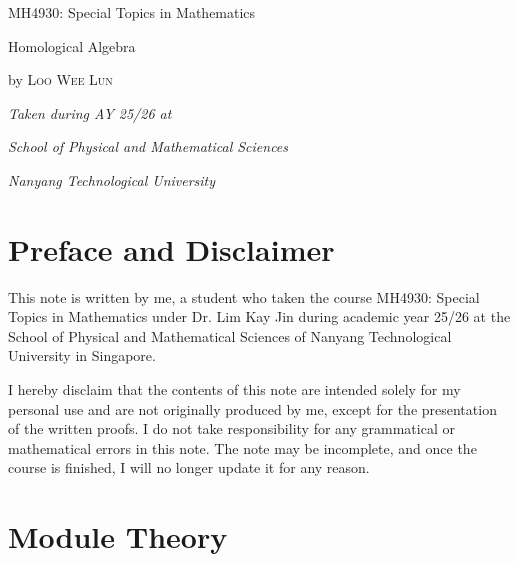 \documentclass{article}
\theoremstyle{definition}
\begin{document}
\begin{titlepage}
        \centering
        \hfill\par
        \vspace{4\baselineskip}
        {\Huge 
        MH4930: Special Topics in Mathematics \par Homological Algebra}
        \vspace{4\baselineskip}
        
        {by \Large\textsc{Loo Wee Lun}\par}
        \vfill
        \em Taken during AY 25/26 at\par
        {\em School of Physical and Mathematical Sciences} \par
        {\em Nanyang Technological University}
\end{titlepage}

\tableofcontents

\newpage
\setcounter{section}{-1}
\section{Preface and Disclaimer}
This note is written by me, a student who taken the course MH4930: Special Topics in Mathematics under Dr. Lim Kay Jin during academic year 25/26 at the School of Physical and Mathematical Sciences of Nanyang Technological University in Singapore. 

I hereby disclaim that the contents of this note are intended solely for my personal use and are not originally produced by me, except for the presentation of the written proofs. I do not take responsibility for any grammatical or mathematical errors in this note. The note may be incomplete, and once the course is finished, I will no longer update it for any reason.


\newpage
\section{Module Theory}











%
%
\end{document}

